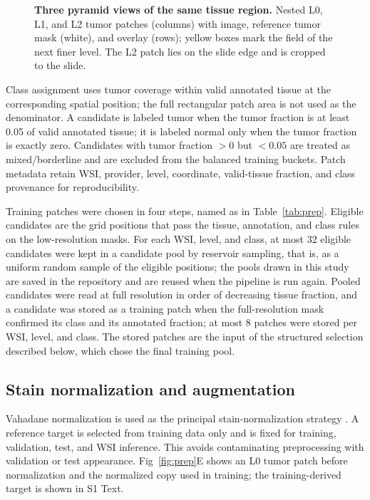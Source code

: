 \documentclass[10pt,letterpaper]{article}
\begin{document}
\begin{figure}[H]
\centering
\caption{\textbf{Three pyramid views of the same tissue region.} Nested L0, L1, and L2 tumor patches (columns) with image, reference tumor mask (white), and overlay (rows); yellow boxes mark the field of the next finer level. The L2 patch lies on the slide edge and is cropped to the slide.}
\label{fig:levels}
\end{figure}

Class assignment uses tumor coverage within valid annotated tissue at the corresponding spatial position; the full rectangular patch area is not used as the denominator. A candidate is labeled tumor when the tumor fraction is at least 0.05 of valid annotated tissue; it is labeled normal only when the tumor fraction is exactly zero. Candidates with tumor fraction $>0$ but $<0.05$ are treated as mixed/borderline and are excluded from the balanced training buckets. Patch metadata retain WSI, provider, level, coordinate, valid-tissue fraction, and class provenance for reproducibility.

Training patches were chosen in four steps, named as in Table~\ref{tab:prep}. Eligible candidates are the grid positions that pass the tissue, annotation, and class rules on the low-resolution masks. For each WSI, level, and class, at most 32 eligible candidates were kept in a candidate pool by reservoir sampling, that is, as a uniform random sample of the eligible positions; the pools drawn in this study are saved in the repository and are reused when the pipeline is run again. Pooled candidates were read at full resolution in order of decreasing tissue fraction, and a candidate was stored as a training patch when the full-resolution mask confirmed its class and its annotated fraction; at most 8 patches were stored per WSI, level, and class. The stored patches are the input of the structured selection described below, which chose the final training pool.

\subsection*{Stain normalization and augmentation}
Vahadane normalization is used as the principal stain-normalization strategy \cite{bib23}. A reference target is selected from training data only and is fixed for training, validation, test, and WSI inference. This avoids contaminating preprocessing with validation or test appearance. Fig~\ref{fig:prep}E shows an L0 tumor patch before normalization and the normalized copy used in training; the training-derived target is shown in S1 Text.
\end{document}
